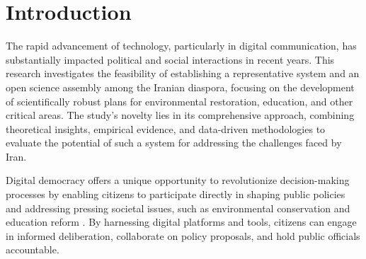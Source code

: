 \documentclass{IEEEtran}
\begin{document}








\section{Introduction}

The rapid advancement of technology, particularly in digital communication, has substantially impacted political and social interactions in recent years. This research investigates the feasibility of establishing a representative system and an open science assembly among the Iranian diaspora, focusing on the development of scientifically robust plans for environmental restoration, education, and other critical areas. The study's novelty lies in its comprehensive approach, combining theoretical insights, empirical evidence, and data-driven methodologies to evaluate the potential of such a system for addressing the challenges faced by Iran.

Digital democracy offers a unique opportunity to revolutionize decision-making processes by enabling citizens to participate directly in shaping public policies and addressing pressing societal issues, such as environmental conservation and education reform \cite{coleman2009internet}. By harnessing digital platforms and tools, citizens can engage in informed deliberation, collaborate on policy proposals, and hold public officials accountable.
\end{document}
